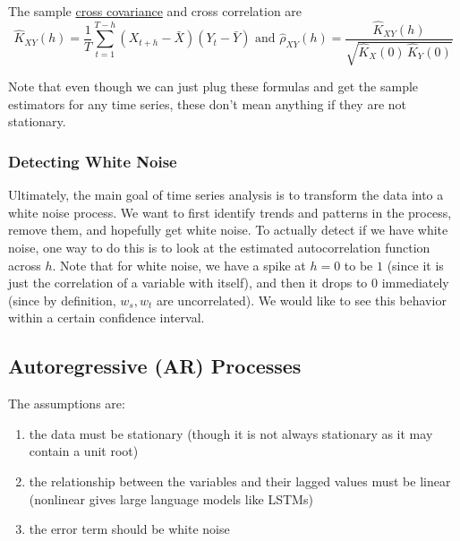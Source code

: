 \documentclass{article}
\begin{document}
    The sample \hyperref[def:cross-covariance]{cross covariance} and cross correlation are 
    \begin{equation}
      \hat{K}_{XY} (h) = \frac{1}{T} \sum_{t=1}^{T-h} (X_{t+h} - \bar{X}) (Y_{t} - \bar{Y}) \text{ and } \hat{\rho}_{XY} (h) = \frac{\hat{K}_{XY}(h)}{\sqrt{\hat{K}_X (0) \, \hat{K}_Y (0)}}
    \end{equation}

    Note that even though we can just plug these formulas and get the sample estimators for any time series, these don't mean anything if they are not stationary. 

  \subsubsection{Detecting White Noise}

    Ultimately, the main goal of time series analysis is to transform the data into a white noise process. We want to first identify trends and patterns in the process, remove them, and hopefully get white noise. To actually detect if we have white noise, one way to do this is to look at the estimated autocorrelation function across $h$. Note that for white noise, we have a spike at $h = 0$ to be $1$ (since it is just the correlation of a variable with itself), and then it drops to $0$ immediately (since by definition, $w_s, w_t$ are uncorrelated). We would like to see this behavior within a certain confidence interval. 

\subsection{Autoregressive (AR) Processes}

  The assumptions are: 
  \begin{enumerate}
    \item the data must be stationary (though it is not always stationary as it may contain a unit root)
    \item the relationship between the variables and their lagged values must be linear (nonlinear gives large language models like LSTMs)
    \item the error term should be white noise
  \end{enumerate}
\end{document}
